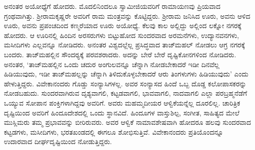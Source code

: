  ಅನಂತರ ಅಯೋಧ್ಯೆಗೆ ಹೋದರು. ಮೊದಲಿನಿಂದಲೂ ಸ್ವಾಮೀಜಿಯವರಿಗೆ ರಾಮಾಯಣವು ಪ್ರಿಯವಾದ ಗ್ರಂಥವಾಗಿತ್ತು. ಶ‍್ರೀರಾಮಕೃಷ್ಣರೇ ಅವರಿಗೆ ರಾಮ ಮಂತ್ರವನ್ನು ಕೊಟ್ಟಿದ್ದರು. ಶ‍್ರೀರಾಮ ಜನಿಸಿದ ಊರು, ಅವನು ಆಳಿದ ಊರು, ಅವನು ಪ್ರಪಂಚದಿಂದ ಕಣ್ಮರೆಯಾದ ಊರು ಅಯೋಧ್ಯೆ. ಕೆಲವು ಕಾಲ ಅಲ್ಲಿದ್ದು ಅಲ್ಲಿಂದ ಲಕ್ನೋ ನಗರಕ್ಕೆ ಹೋದರು. ಆ ಊರಿನಲ್ಲಿ ಹಿಂದಿನ ಅರಸರುಗಳು ಬಿಟ್ಟುಹೋದ ಸುಂದರವಾದ ಅರಮನೆಗಳು, ಉದ್ಯಾನವನಗಳು, ಮಸೀದಿಗಳು ಎಲ್ಲವನ್ನೂ ನೋಡಿದರು. ಅನಂತರ ವಿಶ್ವದಲ್ಲೆಲ್ಲ ಪ್ರಸಿದ್ಧವಾದ ತಾಜ್‍ಮಹಲ್ ನೋಡಲು ಆಗ್ರ ನಗರಕ್ಕೆ ಬಂದರು. ತಾಜ್‍ಮಹಲ್ಲಿನ ಸೌಂದರ‍್ಯಕ್ಕೆ ಪರವಶರಾದರು. ಅದನ್ನು ಬೇರೆ ಬೇರೆ ದೃಷ್ಟಿಕೋನಗಳಿಂದ ನೋಡಿದರು. ಅನಂತರ, ‘ತಾಜ್‍ಮಹಲ್ಲಿನ ಒಂದು ಚದುರ ಅಂಗುಲವನ್ನೂ ಚೆನ್ನಾಗಿ ನೋಡಬೇಕಾದರೆ ಇಡೀ ದಿನವೆಲ್ಲ ಹಿಡಿಯುವುದು, ಇಡೀ ತಾಜ್‍ಮಹಲ್ಲನ್ನು ಚೆನ್ನಾಗಿ ತಿಳಿದುಕೊಳ್ಳಬೇಕಾದರೆ ಆರು ತಿಂಗಳುಗಳು ಹಿಡಿಯುವುದು’ ಎಂದು ಹೇಳುತ್ತಿದ್ದರು. ವಿವೇಕಾನಂದರು ಗೊಡ್ಡು ಸಂನ್ಯಾಸಿಗಳಲ್ಲ. ಅವರ ಸಂನ್ಯಾಸದ ಹಿಂದೆ ಒಬ್ಬ ದೊಡ್ಡ ಕಲೋಪಾಸಕರನ್ನು ನೋಡಬಹುದು. ಸುಂದರವಾಗಿರುವ ದೃಶ್ಯವಾಗಲಿ, ಕಟ್ಟಡವಾಗಲಿ, ಭಾವವಾಗಲಿ, ನಾದವಾಗಲಿ ಎಲ್ಲಾ ಪರಬ್ರಹ್ಮನೆಡೆಗೆ ಒಯ್ಯುವ ಸೋಪಾನ ಪಂಕ್ತಿಗಳಾಗಿದ್ದವು ಅವರಿಗೆ. ಅವರು ಮಹಮ್ಮದೀಯರ ಆಳ್ವಿಕೆಯನ್ನೆಲ್ಲ ದೂರಲಿಲ್ಲ. ಚಾರಿತ್ರಿಕ ದೃಷ್ಟಿಯಿಂದ ಅವರಿಗೆ ಹಿಂದೂದೇಶದಲ್ಲಿ ಒಂದು ಸ್ಥಾನವಿದೆ. ಹಿಂದೂಗಳ ವಾಸ್ತುಶಿಲ್ಪ, ಸಂಗೀತ, ಸಾಹಿತ್ಯದ ಮೇಲೆ ಮುಸ್ಲಿಮರು ತಮ್ಮ ಪ್ರಭಾವವನ್ನು ಬೀರಿರುವರು. ಅವರ ಆಳ್ವಿಕೆ ನಾಮಾವಶೇಷವಾಗಿ ಹೋದರೂ ಹಲವು ಸುಂದರವಾದ ಕಟ್ಟಡಗಳು, ಮಸೀದಿಗಳು, ಭರತಖಂಡದಲ್ಲಿ ಈಗಲೂ ಶೋಭಿಸುತ್ತಿವೆ. ವಿವೇಕಾನಂದರು ಪ್ರತಿಯೊಂದನ್ನೂ ಉದಾರವಾದ ದೀರ್ಘದೃಷ್ಟಿಯಿಂದ ನೋಡುತ್ತಿದ್ದರು. 

